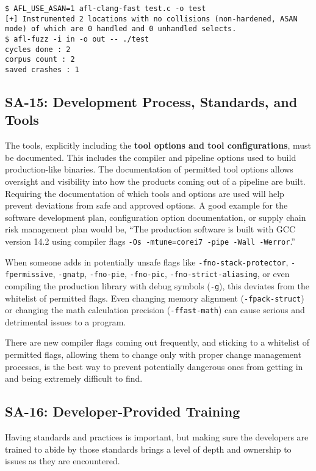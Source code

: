 \begin{lstlisting}[caption={Fuzzing for Crashes},captionpos=b,style=BashStyle,label={lst:20250127:fuzz}]
$ AFL_USE_ASAN=1 afl-clang-fast test.c -o test
[+] Instrumented 2 locations with no collisions (non-hardened, ASAN mode) of which are 0 handled and 0 unhandled selects.
$ afl-fuzz -i in -o out -- ./test
cycles done : 2
corpus count : 2
saved crashes : 1
\end{lstlisting}

\subsection*{SA-15: Development Process, Standards, and Tools}
The tools, explicitly including the \textbf{tool options and tool configurations}, must be documented. This includes the compiler and pipeline options used to build production-like binaries. The documentation of permitted tool options allows oversight and visibility into how the products coming out of a pipeline are built. Requiring the documentation of which tools and options are used will help prevent deviations from safe and approved options. A good example for the software development plan, configuration option documentation, or supply chain risk management plan would be, ``The production software is built with GCC version 14.2 using compiler flags \texttt{-Os -mtune=corei7 -pipe -Wall -Werror}.''

When someone adds in potentially unsafe flags like \texttt{-fno-stack-protector}, \texttt{-fpermissive}, \texttt{-gnatp}, \texttt{-fno-pie}, \texttt{-fno-pic}, \texttt{-fno-strict-aliasing}, or even compiling the production library with debug symbols (\texttt{-g}), this deviates from the whitelist of permitted flags. Even changing memory alignment (\texttt{-fpack-struct}) or changing the math calculation precision (\texttt{-ffast-math}) can cause serious and detrimental issues to a program.

There are new compiler flags coming out frequently, and sticking to a whitelist of permitted flags, allowing them to change only with proper change management processes, is the best way to prevent potentially dangerous ones from getting in and being extremely difficult to find.

\subsection*{SA-16: Developer-Provided Training}
Having standards and practices is important, but making sure the developers are trained to abide by those standards brings a level of depth and ownership to issues as they are encountered. 

